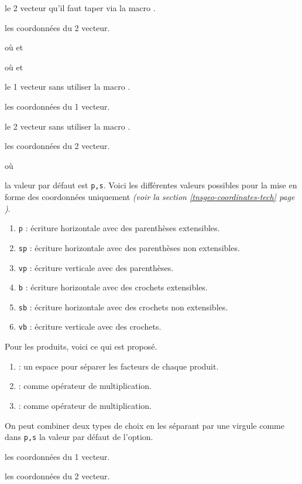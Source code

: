 \documentclass[12pt,a4paper]{article}
\begin{document}
 le 2\ieme{} vecteur qu'il faut taper via la macro .

 les coordonnées du 2\ieme{} vecteur.


\separation


  où \quad {}
                                    et 

  où \quad {}
                                    et 

 le 1\ier{} vecteur sans utiliser la macro .

 les coordonnées du 1\ier{} vecteur.

 le 2\ieme{} vecteur sans utiliser la macro .

 les coordonnées du 2\ieme{} vecteur.


\separation


  où \quad {}

\IDoption{} la valeur par défaut est \verb+p,s+. 
            Voici les différentes valeurs possibles pour la mise en forme des coordonnées uniquement \emph{(voir la section \ref{tnsgeo-coordinates-tech} page \pageref{tnsgeo-coordinates-tech})}.
\begin{enumerate}
	\item \verb+p+ : écriture horizontale avec des parenthèses extensibles.

	\item \verb+sp+ : écriture horizontale avec des parenthèses non extensibles.

	\item \verb+vp+ : écriture verticale avec des parenthèses.

	\medskip
	
	\item \verb+b+ : écriture horizontale avec des crochets extensibles.

	\item \verb+sb+ : écriture horizontale avec des crochets non extensibles.

	\item \verb+vb+ : écriture verticale avec des crochets.
\end{enumerate}

            Pour les produits, voici ce qui est proposé.
\begin{enumerate}
	\item {} : un espace pour séparer les facteurs de chaque produit.

	\item {} :  comme opérateur de multiplication.

	\item {} :  comme opérateur de multiplication.
\end{enumerate}

            On peut combiner deux types de choix en les séparant par une virgule comme dans \verb+p,s+ la valeur par défaut de l'option.


 les coordonnées du 1\ier{} vecteur.

 les coordonnées du 2\ieme{} vecteur.
\end{document}
